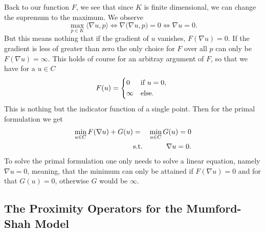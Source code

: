 	    Back to our function $F$, we see that since $K$ is finite dimensional, we can change the supremum to the maximum. We observe
	    	$$
	    		\max_{p \in K} \langle \nabla u, p \rangle \Longleftrightarrow \nabla \big( \nabla u, p \big) = 0 \Longleftrightarrow \nabla u = 0.
	    	$$
	    But this means nothing that if the gradient of $u$ vanishes, $F(\nabla u) = 0$. If the gradient is less of greater than zero the only choice for $F$ over all $p$ can only be $F(\nabla u) = \infty$. This holds of course for an arbitray argument of $F$, so that we have for a $u \in C$
	    	$$
	    		F(u) =
	    			\begin{dcases*}
	    				0 & \textnormal{if $u = 0$,} \\
	    				\infty & \textnormal{else.}
	    			\end{dcases*}
	    	$$
    	This is nothing but the indicator function of a single point. Then for the primal formulation we get
	    	\begin{eqnarray}
	    		\min_{u \in C} F(\nabla u) + G(u) &=& \min_{u \in C} G(u) = 0\\
	    		&\textnormal{s.t.}& \,\,\, \nabla u = 0.
	    		\label{eq:primal_mumford_shah}
	    	\end{eqnarray}
	    To solve the primal formulation one only needs to solve a linear equation, namely $\nabla u = 0$, meaning, that the minimum can only be attained if $F(\nabla u) = 0$ and for that $G(u) = 0$, otherwise $G$ would be $\infty$.




    \subsection{The Proximity Operators for the Mumford-Shah Model} %
    \label{sub:the_proximity_operators_for_the_mumford_shah_model}
    	
